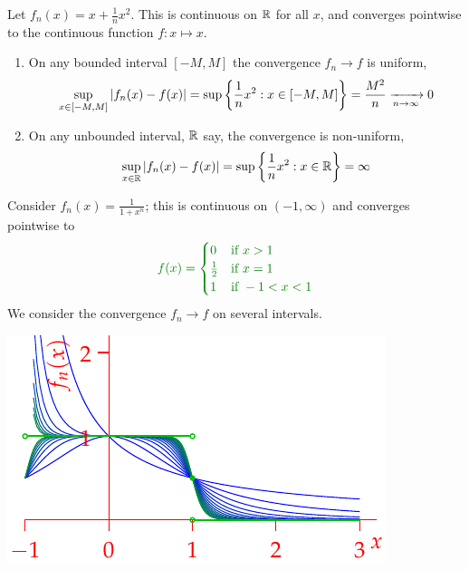 \begin{examples}{}{}
\exstart Let $f_n(x)=x+\frac 1nx^2$. This is continuous on $\mathbb{R}$ for all $x$, and converges pointwise to the continuous function $f:x\mapsto x$.
\begin{enumerate}\setcounter{enumi}{1}
  \item[]\begin{enumerate}
    \item On any bounded interval $[-M,M]$ the convergence $f_n\to f$ is uniform,
    \[\sup_{x\in[-M,M]}\left| f_n(x)-f(x)\right|=\sup\left\{\frac 1nx^2:x\in[-M,M]\right\}=\frac{M^2}n \xrightarrow[n\to\infty]{}0\]
    \item On any unbounded interval, $\mathbb{R}$ say, the convergence is non-uniform,
    \[\sup_{x\in\R}\nm{f_n(x)-f(x)}=\sup\left\{\frac 1nx^2:x\in\R\right\}=\infty %
    \]
  \end{enumerate}
  
  \begin{minipage}[t]{0.53\linewidth}\vspace{0pt}
  \item Consider $f_n(x)=\frac 1{1+x^n}$; this is continuous on $(-1,\infty)$ and converges pointwise to
  \[\textcolor{Green}{f(x)=\begin{cases}
  0&\text{if }x>1\\
  \frac 12&\text{if }x=1\\
  1&\text{if }-1<x<1
  \end{cases}}\]
  We consider the convergence $f_n\to f$ on several intervals.
  \end{minipage}\begin{minipage}[t]{0.46\linewidth}\vspace{0pt}
  \flushright\includegraphics{seqex4}
  \end{minipage}


\end{enumerate}
\end{examples}
